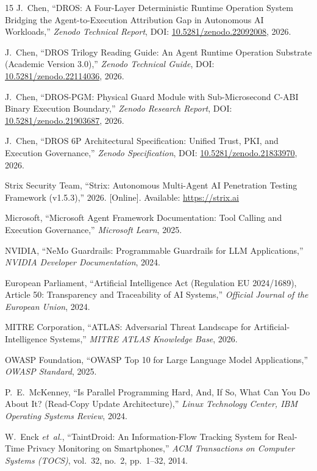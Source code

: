 \documentclass[conference]{IEEEtran}
\begin{document}
\begin{thebibliography}{15}
J.~Chen, ``DROS: A Four-Layer Deterministic Runtime Operation System Bridging the Agent-to-Execution Attribution Gap in Autonomous AI Workloads,'' \emph{Zenodo Technical Report}, DOI: \url{10.5281/zenodo.22092008}, 2026.

J.~Chen, ``DROS Trilogy Reading Guide: An Agent Runtime Operation Substrate (Academic Version 3.0),'' \emph{Zenodo Technical Guide}, DOI: \url{10.5281/zenodo.22114036}, 2026.

J.~Chen, ``DROS-PGM: Physical Guard Module with Sub-Microsecond C-ABI Binary Execution Boundary,'' \emph{Zenodo Research Report}, DOI: \url{10.5281/zenodo.21903687}, 2026.

J.~Chen, ``DROS 6P Architectural Specification: Unified Trust, PKI, and Execution Governance,'' \emph{Zenodo Specification}, DOI: \url{10.5281/zenodo.21833970}, 2026.

Strix Security Team, ``Strix: Autonomous Multi-Agent AI Penetration Testing Framework (v1.5.3),'' 2026. [Online]. Available: \url{https://strix.ai}

Microsoft, ``Microsoft Agent Framework Documentation: Tool Calling and Execution Governance,'' \emph{Microsoft Learn}, 2025.

NVIDIA, ``NeMo Guardrails: Programmable Guardrails for LLM Applications,'' \emph{NVIDIA Developer Documentation}, 2024.

European Parliament, ``Artificial Intelligence Act (Regulation EU 2024/1689), Article 50: Transparency and Traceability of AI Systems,'' \emph{Official Journal of the European Union}, 2024.

MITRE Corporation, ``ATLAS: Adversarial Threat Landscape for Artificial-Intelligence Systems,'' \emph{MITRE ATLAS Knowledge Base}, 2026.

OWASP Foundation, ``OWASP Top 10 for Large Language Model Applications,'' \emph{OWASP Standard}, 2025.

P.~E.~McKenney, ``Is Parallel Programming Hard, And, If So, What Can You Do About It? (Read-Copy Update Architecture),'' \emph{Linux Technology Center, IBM Operating Systems Review}, 2024.

W.~Enck \emph{et~al.}, ``TaintDroid: An Information-Flow Tracking System for Real-Time Privacy Monitoring on Smartphones,'' \emph{ACM Transactions on Computer Systems (TOCS)}, vol.~32, no.~2, pp.~1--32, 2014.


\end{thebibliography}
\end{document}
